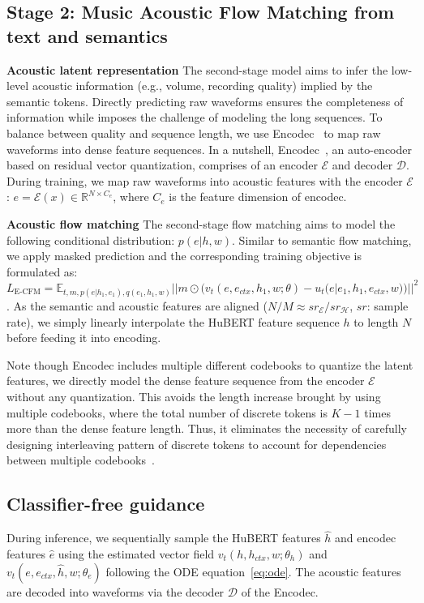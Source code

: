\subsection{Stage 2: Music Acoustic Flow Matching from text and semantics}
\textbf{Acoustic latent representation} The second-stage model aims to infer the low-level acoustic information (e.g., volume, recording quality) implied by the semantic tokens. Directly predicting raw waveforms ensures the completeness of information while imposes the challenge of modeling the long sequences. To balance between quality and sequence length, we use Encodec~\cite{defossez2022highfi} to map raw waveforms into dense feature sequences. In a nutshell, Encodec~\cite{defossez2022highfi}, an auto-encoder based on residual vector quantization, comprises of an encoder $\mathcal{E}$ and decoder $\mathcal{D}$. During training, we map raw waveforms into acoustic features with the encoder $\mathcal{E}$: $e=\mathcal{E}(x)\in\mathbb{R}^{N\times C_e}$, where $C_e$ is the feature dimension of encodec.

\textbf{Acoustic flow matching} The second-stage flow matching aims to model the following conditional distribution: $p(e|h, w)$. Similar to semantic flow matching, we apply masked prediction and the corresponding training objective is formulated as: $L_{\text{E-CFM}}=\mathbb{E}_{t,m,p(e|h_1, e_1),q(e_1, h_1,w)}||m\odot(v_t(e,e_{ctx},h_1,w;\theta)-u_t(e|e_1,h_1,e_{ctx},w))||^2$. 
As the semantic and acoustic features are aligned ($N/M\approx{sr}_\mathcal{E}/{sr}_\mathcal{H}$, $sr$: sample rate), we simply linearly interpolate the HuBERT feature sequence $h$ to length $N$ before feeding it into encoding. 

Note though Encodec includes multiple different codebooks to quantize the latent features, we directly model the dense feature sequence from the encoder $\mathcal{E}$ without any quantization. This avoids the length increase brought by using multiple codebooks, where the total number of discrete tokens is $K-1$ times more than the dense feature length. Thus, it eliminates the necessity of carefully designing interleaving pattern of discrete tokens to account for dependencies between multiple codebooks~\cite{musicgen,Wang2023NeuralCL}.

\subsection{Classifier-free guidance}

During inference, we sequentially sample the HuBERT features $\hat{h}$ and encodec features $\hat{e}$ using the estimated vector field $v_t(h,h_{ctx},w;\theta_h)$ and $v_t(e,e_{ctx},\hat{h},w;\theta_e)$ following the ODE equation~\ref{eq:ode}. 
The acoustic features are decoded into waveforms via the decoder $\mathcal{D}$ of the Encodec.


